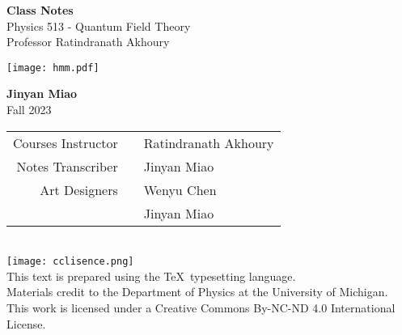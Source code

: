 \documentclass[11pt, onesided]{book}
\theoremstyle{break}
\theoremstyle{break}
\begin{document}
	\begin{titlepage}
		\begin{center}
			\vspace*{0.5cm}
			\Huge \color{red}
				\textbf{Class Notes}\\
			\vspace{0.5cm}			
			\Large \color{black}
			Physics 513 - Quantum Field Theory\\
			Professor Ratindranath Akhoury
			\vspace{1.5cm}

			\texttt{[image: hmm.pdf]}
			
			
			\vspace{2cm}
			\LARGE
				\textbf{Jinyan Miao}\\
				\hfill\break
				\LARGE Fall 2023\\
			\vspace{1cm}

		\vspace*{\fill}
		\end{center}			
	\end{titlepage}



\tableofcontents
\hfill\break
\hfill\break
\hfill\break
 

\newpage
\setcounter{page}{1}
\vspace*{\fill}

\begin{center}
\begin{tabular}{rcl}
Courses Instructor & & Ratindranath Akhoury \medskip
\\
Notes Transcriber & & Jinyan Miao \medskip
\\
Art Designers & & Wenyu Chen \\
 & & Jinyan Miao \bigskip
\end{tabular} \\
\medskip
\texttt{[image: cclisence.png]}\\
\medskip
This text is prepared using the \TeX\ typesetting language. \\
Materials  credit to the Department of Physics at the University of Michigan.\\
This work is licensed under a Creative Commons By-NC-ND 4.0 International License.  \\
\end{center}
\end{document}
